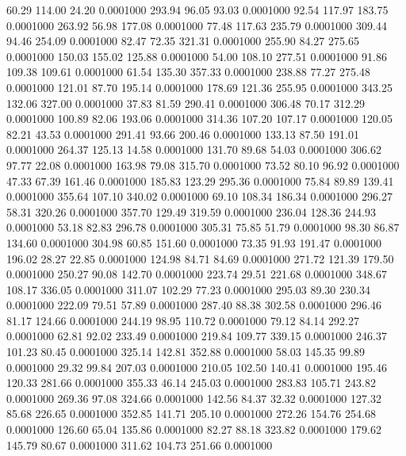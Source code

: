   60.29  114.00   24.20   0.0001000
 293.94   96.05   93.03   0.0001000
  92.54  117.97  183.75   0.0001000
 263.92   56.98  177.08   0.0001000
  77.48  117.63  235.79   0.0001000
 309.44   94.46  254.09   0.0001000
  82.47   72.35  321.31   0.0001000
 255.90   84.27  275.65   0.0001000
 150.03  155.02  125.88   0.0001000
  54.00  108.10  277.51   0.0001000
  91.86  109.38  109.61   0.0001000
  61.54  135.30  357.33   0.0001000
 238.88   77.27  275.48   0.0001000
 121.01   87.70  195.14   0.0001000
 178.69  121.36  255.95   0.0001000
 343.25  132.06  327.00   0.0001000
  37.83   81.59  290.41   0.0001000
 306.48   70.17  312.29   0.0001000
 100.89   82.06  193.06   0.0001000
 314.36  107.20  107.17   0.0001000
 120.05   82.21   43.53   0.0001000
 291.41   93.66  200.46   0.0001000
 133.13   87.50  191.01   0.0001000
 264.37  125.13   14.58   0.0001000
 131.70   89.68   54.03   0.0001000
 306.62   97.77   22.08   0.0001000
 163.98   79.08  315.70   0.0001000
  73.52   80.10   96.92   0.0001000
  47.33   67.39  161.46   0.0001000
 185.83  123.29  295.36   0.0001000
  75.84   89.89  139.41   0.0001000
 355.64  107.10  340.02   0.0001000
  69.10  108.34  186.34   0.0001000
 296.27   58.31  320.26   0.0001000
 357.70  129.49  319.59   0.0001000
 236.04  128.36  244.93   0.0001000
  53.18   82.83  296.78   0.0001000
 305.31   75.85   51.79   0.0001000
  98.30   86.87  134.60   0.0001000
 304.98   60.85  151.60   0.0001000
  73.35   91.93  191.47   0.0001000
 196.02   28.27   22.85   0.0001000
 124.98   84.71   84.69   0.0001000
 271.72  121.39  179.50   0.0001000
 250.27   90.08  142.70   0.0001000
 223.74   29.51  221.68   0.0001000
 348.67  108.17  336.05   0.0001000
 311.07  102.29   77.23   0.0001000
 295.03   89.30  230.34   0.0001000
 222.09   79.51   57.89   0.0001000
 287.40   88.38  302.58   0.0001000
 296.46   81.17  124.66   0.0001000
 244.19   98.95  110.72   0.0001000
  79.12   84.14  292.27   0.0001000
  62.81   92.02  233.49   0.0001000
 219.84  109.77  339.15   0.0001000
 246.37  101.23   80.45   0.0001000
 325.14  142.81  352.88   0.0001000
  58.03  145.35   99.89   0.0001000
  29.32   99.84  207.03   0.0001000
 210.05  102.50  140.41   0.0001000
 195.46  120.33  281.66   0.0001000
 355.33   46.14  245.03   0.0001000
 283.83  105.71  243.82   0.0001000
 269.36   97.08  324.66   0.0001000
 142.56   84.37   32.32   0.0001000
 127.32   85.68  226.65   0.0001000
 352.85  141.71  205.10   0.0001000
 272.26  154.76  254.68   0.0001000
 126.60   65.04  135.86   0.0001000
  82.27   88.18  323.82   0.0001000
 179.62  145.79   80.67   0.0001000
 311.62  104.73  251.66   0.0001000
